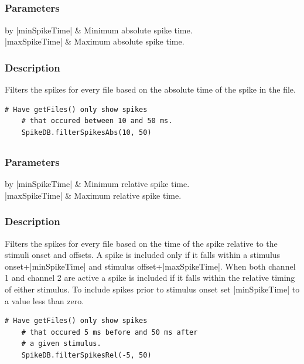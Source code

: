 \documentclass{report}
\begin{document}
\clearpage
\subsection{}
\subsubsection{Parameters}
\begin{center}
\begin{tabular}{by}
	|minSpikeTime| & Minimum absolute spike time.\\
	|maxSpikeTime| & Maximum absolute spike time.\\
\end{tabular}
\end{center}
\subsubsection{Description}
Filters the spikes for every file based on the absolute time of the spike in the file.
\begin{lstlisting}[caption=Example]
	# Have getFiles() only show spikes 
	# that occured between 10 and 50 ms.
	SpikeDB.filterSpikesAbs(10, 50)
\end{lstlisting}

\clearpage
\subsection{}
\subsubsection{Parameters}
\begin{table}[h]
\begin{center}
\begin{tabular}{by}
		|minSpikeTime| & Minimum relative spike time.\\
		|maxSpikeTime| & Maximum relative spike time.\\
	\end{tabular}
\end{center}
\end{table}
\subsubsection{Description}
Filters the spikes for every file based on the time of the spike relative to the stimuli onset and offsets. A spike is included only if it falls within a stimulus onset+|minSpikeTime| and stimulus offset+|maxSpikeTime|. When both channel 1 and channel 2 are active a spike is included if it falls within the relative timing of either stimulus. To include spikes prior to stimulus onset set |minSpikeTime| to a value less than zero.
\begin{lstlisting}[caption=Example]
	# Have getFiles() only show spikes 
	# that occured 5 ms before and 50 ms after
	# a given stimulus.
	SpikeDB.filterSpikesRel(-5, 50)
\end{lstlisting}
\end{document}
